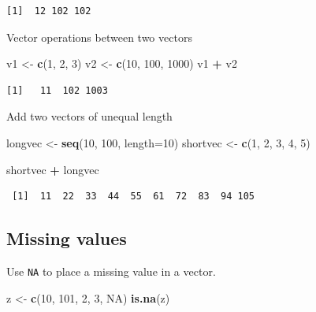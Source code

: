 \documentclass[]{book}
\newenvironment{Shaded}{\begin{snugshade}}{\end{snugshade}}
\newcommand{\DataTypeTok}[1]{\textcolor[rgb]{0.13,0.29,0.53}{#1}}
\newcommand{\DecValTok}[1]{\textcolor[rgb]{0.00,0.00,0.81}{#1}}
\newcommand{\KeywordTok}[1]{\textcolor[rgb]{0.13,0.29,0.53}{\textbf{#1}}}
\newcommand{\NormalTok}[1]{#1}
\newcommand{\OperatorTok}[1]{\textcolor[rgb]{0.81,0.36,0.00}{\textbf{#1}}}
\newcommand{\OtherTok}[1]{\textcolor[rgb]{0.56,0.35,0.01}{#1}}
\newcommand{\StringTok}[1]{\textcolor[rgb]{0.31,0.60,0.02}{#1}}
\begin{document}
\begin{verbatim}
[1]  12 102 102
\end{verbatim}

Vector operations between two vectors

\begin{Shaded}
\begin{Highlighting}[]
\NormalTok{v1 <-}\StringTok{ }\KeywordTok{c}\NormalTok{(}\DecValTok{1}\NormalTok{, }\DecValTok{2}\NormalTok{, }\DecValTok{3}\NormalTok{)}
\NormalTok{v2 <-}\StringTok{ }\KeywordTok{c}\NormalTok{(}\DecValTok{10}\NormalTok{, }\DecValTok{100}\NormalTok{, }\DecValTok{1000}\NormalTok{)}
\NormalTok{v1 }\OperatorTok{+}\StringTok{ }\NormalTok{v2}
\end{Highlighting}
\end{Shaded}

\begin{verbatim}
[1]   11  102 1003
\end{verbatim}

Add two vectors of unequal length

\begin{Shaded}
\begin{Highlighting}[]
\NormalTok{longvec <-}\StringTok{ }\KeywordTok{seq}\NormalTok{(}\DecValTok{10}\NormalTok{, }\DecValTok{100}\NormalTok{, }\DataTypeTok{length=}\DecValTok{10}\NormalTok{)}
\NormalTok{shortvec <-}\StringTok{ }\KeywordTok{c}\NormalTok{(}\DecValTok{1}\NormalTok{, }\DecValTok{2}\NormalTok{, }\DecValTok{3}\NormalTok{, }\DecValTok{4}\NormalTok{, }\DecValTok{5}\NormalTok{)}

\NormalTok{shortvec }\OperatorTok{+}\StringTok{ }\NormalTok{longvec}
\end{Highlighting}
\end{Shaded}

\begin{verbatim}
 [1]  11  22  33  44  55  61  72  83  94 105
\end{verbatim}

\hypertarget{missing-values}{%
\subsection{Missing values}\label{missing-values}}

Use \texttt{NA} to place a missing value in a vector.

\begin{Shaded}
\begin{Highlighting}[]
\NormalTok{z <-}\StringTok{ }\KeywordTok{c}\NormalTok{(}\DecValTok{10}\NormalTok{, }\DecValTok{101}\NormalTok{, }\DecValTok{2}\NormalTok{, }\DecValTok{3}\NormalTok{, }\OtherTok{NA}\NormalTok{)}
\KeywordTok{is.na}\NormalTok{(z)}
\end{Highlighting}
\end{Shaded}
\end{document}
